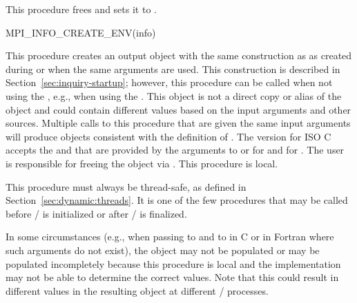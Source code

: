 This procedure frees  and sets it to .

\begin{funcdef}{MPI\_INFO\_CREATE\_ENV}{(\mbox{info})}
\end{funcdef}

This procedure creates an output object  with the same construction as
 as created during  or  when the
same arguments are used.
This construction is described in Section~\ref{sec:inquiry-startup};
however, this procedure can be called when not using the \wpm{}, e.g., when using the \spm{}.
This object is not a direct
copy or alias of the  object and could contain different values based on the
input arguments and other sources.  Multiple calls to this procedure that are given the same input
arguments will produce  objects consistent with the definition of
.  The version for ISO C accepts the  and  that are
provided by the arguments to  or  for  and  for
.  The user is responsible for freeing the  object via
.  This procedure is local.

This procedure must always be thread-safe, as defined in Section~\ref{sec:dynamic:threads}.  It is
one of the few procedures that may be called before \MPI/ is initialized or after \MPI/ is finalized.

\begin{users}

    In some circumstances (e.g., when passing  to  and  to
     in C or in Fortran where such arguments do not exist), the  object
    may not be populated or may be populated incompletely because this procedure is local and the
    implementation may not be able to determine the correct values. Note that this could result in
    different values in the resulting  object at different \MPI/ processes.

\end{users}

